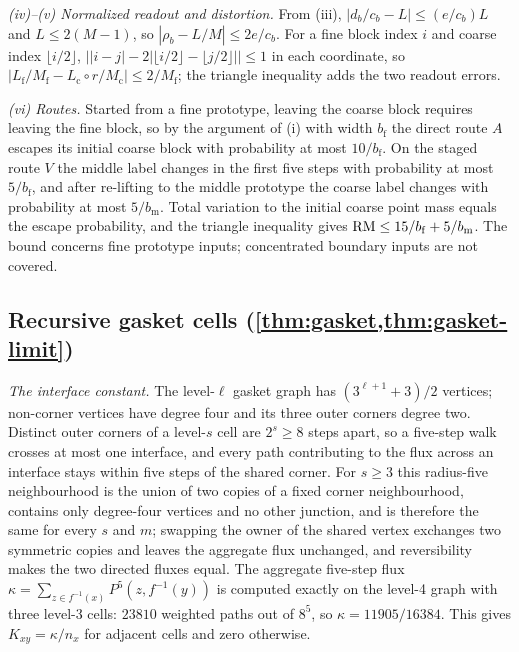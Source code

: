 \emph{(iv)--(v) Normalized readout and distortion.}
From (iii), $|d_b/c_b-L|\le(e/c_b)L$ and $L\le2(M-1)$, so $|\rho_b-L/M|\le2e/c_b$.
For a fine block index $i$ and coarse index $\lfloor i/2\rfloor$, $\bigl||i-j|-2|\lfloor i/2\rfloor-\lfloor j/2\rfloor|\bigr|\le1$ in each coordinate, so $|L_{\mathrm f}/M_{\mathrm f}-L_{\mathrm c}\circ r/M_{\mathrm c}|\le2/M_{\mathrm f}$; the triangle inequality adds the two readout errors.

\emph{(vi) Routes.}
Started from a fine prototype, leaving the coarse block requires leaving the fine block, so by the argument of (i) with width $b_{\mathrm f}$ the direct route $A$ escapes its initial coarse block with probability at most $10/b_{\mathrm f}$.
On the staged route $V$ the middle label changes in the first five steps with probability at most $5/b_{\mathrm f}$, and after re-lifting to the middle prototype the coarse label changes with probability at most $5/b_{\mathrm m}$.
Total variation to the initial coarse point mass equals the escape probability, and the triangle inequality gives $\mathrm{RM}\le15/b_{\mathrm f}+5/b_{\mathrm m}$.
The bound concerns fine prototype inputs; concentrated boundary inputs are not covered.

\subsection{Recursive gasket cells (\texorpdfstring{\cref{thm:gasket,thm:gasket-limit}}{Theorems 6.2 and 6.3})}
\label{app:gasket-proof}

\emph{The interface constant.}
The level-$\ell$ gasket graph has $(3^{\ell+1}+3)/2$ vertices; non-corner vertices have degree four and its three outer corners degree two.
Distinct outer corners of a level-$s$ cell are $2^s\ge8$ steps apart, so a five-step walk crosses at most one interface, and every path contributing to the flux across an interface stays within five steps of the shared corner.
For $s\ge3$ this radius-five neighbourhood is the union of two copies of a fixed corner neighbourhood, contains only degree-four vertices and no other junction, and is therefore the same for every $s$ and $m$; swapping the owner of the shared vertex exchanges two symmetric copies and leaves the aggregate flux unchanged, and reversibility makes the two directed fluxes equal.
The aggregate five-step flux $\kappa=\sum_{z\in f^{-1}(x)}P^5(z,f^{-1}(y))$ is computed exactly on the level-4 graph with three level-3 cells: $23810$ weighted paths out of $8^5$, so $\kappa=11905/16384$.
This gives $K_{xy}=\kappa/n_x$ for adjacent cells and zero otherwise.

